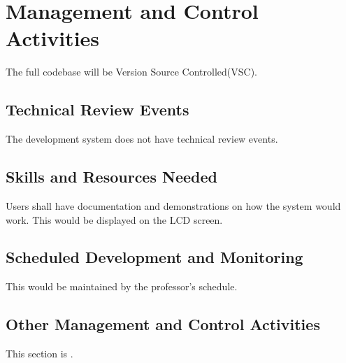 
\chapter{Management and Control Activities}
\label{loc:MngtContrlActivities}
% 

The full codebase will be Version Source Controlled(VSC).

\section{Technical Review Events}
\label{loc:MCA_TechReviewEvents}
% 

The development system does not have technical review events.


\section{Skills and Resources Needed}
\label{loc:MCA_SkillsResourcesNeeded}
% 

Users shall have documentation and demonstrations on how the system would work. This would be displayed on the LCD screen.

\section{Scheduled Development and Monitoring}
\label{loc:MCA_ScheduleDevMonitoring}
% 

This would be maintained by the professor's schedule.


\section{Other Management and Control Activities}
\label{loc:MCA_OtherActivities}
% 

This section is \TBD.